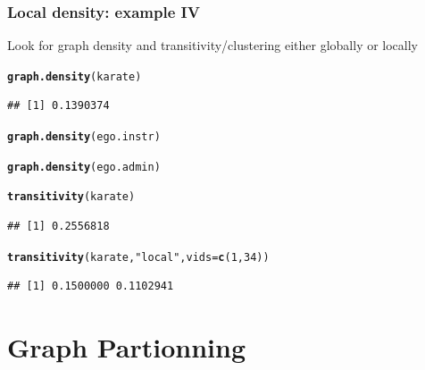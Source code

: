 \documentclass{beamer}\usepackage[]{graphicx}\usepackage[]{color}
\makeatletter
\newcommand{\hlnum}[1]{\textcolor[rgb]{0.686,0.059,0.569}{#1}}%
\newcommand{\hlstr}[1]{\textcolor[rgb]{0.192,0.494,0.8}{#1}}%
\newcommand{\hlstd}[1]{\textcolor[rgb]{0.345,0.345,0.345}{#1}}%
\newcommand{\hlkwc}[1]{\textcolor[rgb]{0.333,0.667,0.333}{#1}}%
\newcommand{\hlkwd}[1]{\textcolor[rgb]{0.737,0.353,0.396}{\textbf{#1}}}%
\newenvironment{kframe}{%
 \def\at@end@of@kframe{}%
 \ifinner\ifhmode%
  \def\at@end@of@kframe{\end{minipage}}%
  \begin{minipage}{\columnwidth}%
 \fi\fi%
 \def\FrameCommand##1{\hskip\@totalleftmargin \hskip-\fboxsep
 \colorbox{shadecolor}{##1}\hskip-\fboxsep
     \hskip-\linewidth \hskip-\@totalleftmargin \hskip\columnwidth}%
 \MakeFramed {\advance\hsize-\width
   \@totalleftmargin\z@ \linewidth\hsize
   \@setminipage}}%
 {\par\unskip\endMakeFramed%
 \at@end@of@kframe}
\newenvironment{knitrout}{}{} %
\makeatother
\begin{document}
\begin{frame}[fragile]
  \frametitle{Local density: example IV}

Look for graph density and transitivity/clustering either globally or locally
\begin{knitrout}\scriptsize
{}\color{fgcolor}\begin{kframe}
\begin{alltt}
\hlkwd{graph.density}\hlstd{(karate)}
\end{alltt}
\begin{verbatim}
## [1] 0.1390374
\end{verbatim}
\begin{alltt}
\hlkwd{graph.density}\hlstd{(ego.instr)}
\end{alltt}


{\ttfamily\noindent\bfseries{}}\begin{alltt}
\hlkwd{graph.density}\hlstd{(ego.admin)}
\end{alltt}


{\ttfamily\noindent\bfseries{}}\begin{alltt}
\hlkwd{transitivity}\hlstd{(karate)}
\end{alltt}
\begin{verbatim}
## [1] 0.2556818
\end{verbatim}
\begin{alltt}
\hlkwd{transitivity}\hlstd{(karate,} \hlstr{"local"}\hlstd{,} \hlkwc{vids}\hlstd{=}\hlkwd{c}\hlstd{(}\hlnum{1}\hlstd{,}\hlnum{34}\hlstd{))}
\end{alltt}
\begin{verbatim}
## [1] 0.1500000 0.1102941
\end{verbatim}
\end{kframe}
\end{knitrout}

\end{frame}


\section{Graph Partionning}
\end{document}
